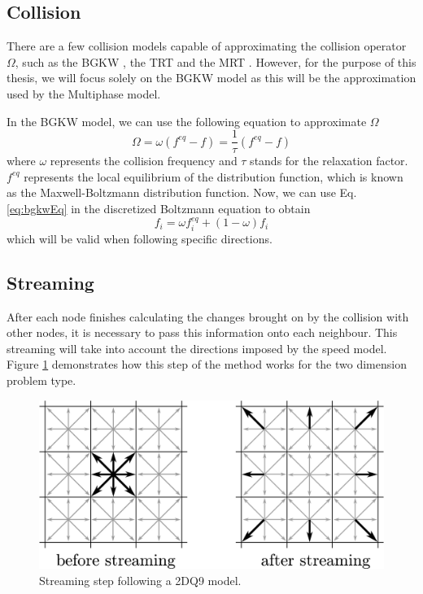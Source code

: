 \documentclass[12pt, openany]{book}
\begin{document}
\subsection{Collision}
There are a few collision models capable of approximating the collision operator $\Omega$, such as the BGKW \cite{bgkw}, the TRT \cite{trt} and the MRT \cite{mrt}. However, for the purpose of this thesis, we will focus solely on the BGKW model as this will be the approximation used by the Multiphase model. \par
In the BGKW model, we can use the following equation to approximate $\Omega$
\begin{equation}\label{eq:bgkwEq}
\Omega = \omega \left( f^{eq} - f\right) = \frac{1}{\tau}\left( f^{eq} - f\right)
\end{equation}
where $\omega$ represents the collision frequency and $\tau$ stands for the relaxation factor. $f^{eq}$ represents the local equilibrium of the distribution function, which is known as the Maxwell-Boltzmann distribution function. Now, we can use Eq. \ref{eq:bgkwEq} in the discretized Boltzmann equation to obtain
\begin{equation}
f_i = \omega f^{eq}_i + (1 - \omega)f_i%
\end{equation}
which will be valid when following specific directions.
\subsection{Streaming}\label{sec:streaming}
After each node finishes calculating the changes brought on by the collision with other nodes, it is necessary to pass this information onto each neighbour. This streaming will take into account the directions imposed by the speed model. Figure \ref{fig:streaming} demonstrates how this step of the method works for the two dimension problem type.

\begin{figure}[H]
	\centering
	\includegraphics[width=0.8\linewidth]{Resources/Images/streaming.png}
	\caption{Streaming step following a 2DQ9 model.}
	\label{fig:streaming}
\end{figure}
\end{document}
